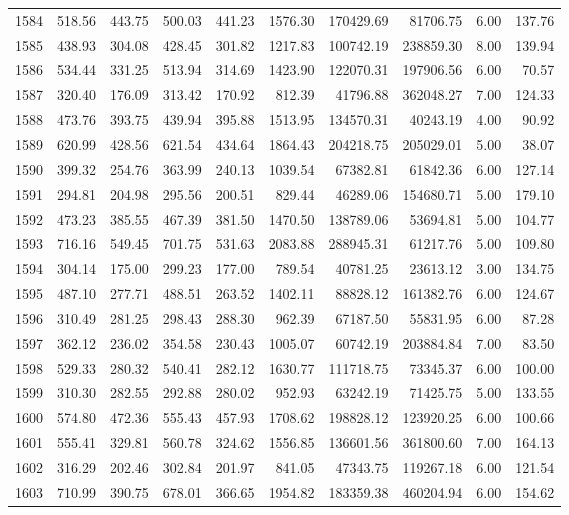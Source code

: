 \begin{tabular}{lrrrrrrrrr}
1584 & 518.56 & 443.75 & 500.03 & 441.23 & 1576.30 & 170429.69 & 81706.75 & 6.00 & 137.76 \\
1585 & 438.93 & 304.08 & 428.45 & 301.82 & 1217.83 & 100742.19 & 238859.30 & 8.00 & 139.94 \\
1586 & 534.44 & 331.25 & 513.94 & 314.69 & 1423.90 & 122070.31 & 197906.56 & 6.00 & 70.57 \\
1587 & 320.40 & 176.09 & 313.42 & 170.92 & 812.39 & 41796.88 & 362048.27 & 7.00 & 124.33 \\
1588 & 473.76 & 393.75 & 439.94 & 395.88 & 1513.95 & 134570.31 & 40243.19 & 4.00 & 90.92 \\
1589 & 620.99 & 428.56 & 621.54 & 434.64 & 1864.43 & 204218.75 & 205029.01 & 5.00 & 38.07 \\
1590 & 399.32 & 254.76 & 363.99 & 240.13 & 1039.54 & 67382.81 & 61842.36 & 6.00 & 127.14 \\
1591 & 294.81 & 204.98 & 295.56 & 200.51 & 829.44 & 46289.06 & 154680.71 & 5.00 & 179.10 \\
1592 & 473.23 & 385.55 & 467.39 & 381.50 & 1470.50 & 138789.06 & 53694.81 & 5.00 & 104.77 \\
1593 & 716.16 & 549.45 & 701.75 & 531.63 & 2083.88 & 288945.31 & 61217.76 & 5.00 & 109.80 \\
1594 & 304.14 & 175.00 & 299.23 & 177.00 & 789.54 & 40781.25 & 23613.12 & 3.00 & 134.75 \\
1595 & 487.10 & 277.71 & 488.51 & 263.52 & 1402.11 & 88828.12 & 161382.76 & 6.00 & 124.67 \\
1596 & 310.49 & 281.25 & 298.43 & 288.30 & 962.39 & 67187.50 & 55831.95 & 6.00 & 87.28 \\
1597 & 362.12 & 236.02 & 354.58 & 230.43 & 1005.07 & 60742.19 & 203884.84 & 7.00 & 83.50 \\
1598 & 529.33 & 280.32 & 540.41 & 282.12 & 1630.77 & 111718.75 & 73345.37 & 6.00 & 100.00 \\
1599 & 310.30 & 282.55 & 292.88 & 280.02 & 952.93 & 63242.19 & 71425.75 & 5.00 & 133.55 \\
1600 & 574.80 & 472.36 & 555.43 & 457.93 & 1708.62 & 198828.12 & 123920.25 & 6.00 & 100.66 \\
1601 & 555.41 & 329.81 & 560.78 & 324.62 & 1556.85 & 136601.56 & 361800.60 & 7.00 & 164.13 \\
1602 & 316.29 & 202.46 & 302.84 & 201.97 & 841.05 & 47343.75 & 119267.18 & 6.00 & 121.54 \\
1603 & 710.99 & 390.75 & 678.01 & 366.65 & 1954.82 & 183359.38 & 460204.94 & 6.00 & 154.62 \\

\end{tabular}
